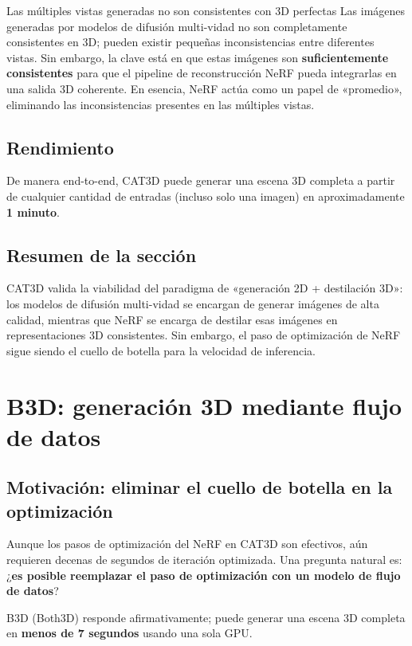 \documentclass[a4paper]{article}
\begin{document}
\begin{warningbox}{Las múltiples vistas generadas no son consistentes con 3D perfectas}
Las imágenes generadas por modelos de difusión multi-vidad no son completamente consistentes en 3D; pueden existir pequeñas inconsistencias entre diferentes vistas. Sin embargo, la clave está en que estas imágenes son \textbf{suficientemente consistentes} para que el pipeline de reconstrucción NeRF pueda integrarlas en una salida 3D coherente. En esencia, NeRF actúa como un papel de «promedio», eliminando las inconsistencias presentes en las múltiples vistas.
\end{warningbox}

\subsection{Rendimiento}

De manera end-to-end, CAT3D puede generar una escena 3D completa a partir de cualquier cantidad de entradas (incluso solo una imagen) en aproximadamente \textbf{1 minuto}.

\subsection{Resumen de la sección}

CAT3D valida la viabilidad del paradigma de «generación 2D + destilación 3D»: los modelos de difusión multi-vidad se encargan de generar imágenes de alta calidad, mientras que NeRF se encarga de destilar esas imágenes en representaciones 3D consistentes. Sin embargo, el paso de optimización de NeRF sigue siendo el cuello de botella para la velocidad de inferencia.

\section{B3D: generación 3D mediante flujo de datos}

\subsection{Motivación: eliminar el cuello de botella en la optimización}

Aunque los pasos de optimización del NeRF en CAT3D son efectivos, aún requieren decenas de segundos de iteración optimizada. Una pregunta natural es: ¿\textbf{es posible reemplazar el paso de optimización con un modelo de flujo de datos}?

B3D (Both3D) responde afirmativamente; puede generar una escena 3D completa en \textbf{menos de 7 segundos} usando una sola GPU.
\end{document}
